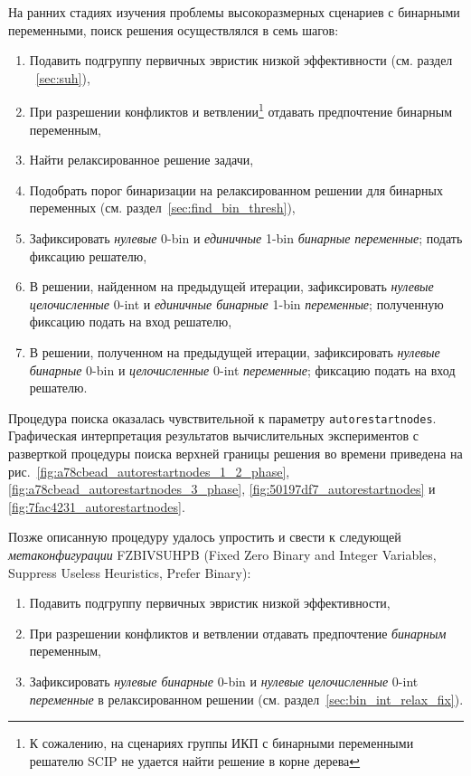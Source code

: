 \documentclass[%
	11pt,
	a4paper,
	utf8,
		]{article}
\begin{document}
На ранних стадиях изучения проблемы высокоразмерных сценариев с бинарными переменными, поиск решения осуществлялся в семь шагов:
\begin{enumerate}
	\item  Подавить подгруппу первичных эвристик низкой эффективности (см. раздел ~\ref{sec:suh}),
	
	\item При разрешении конфликтов и ветвлении\footnote{К сожалению, на сценариях группы ИКП с бинарными переменными решателю SCIP не удается найти решение в корне дерева} отдавать предпочтение бинарным переменным,
	
	\item Найти релаксированное решение задачи,
	
	\item Подобрать порог бинаризации на релаксированном решении для бинарных переменных (см. раздел~\ref{sec:find_bin_thresh}),
	
	\item Зафиксировать \emph{нулевые} 0-bin и \emph{единичные} 1-bin \emph{бинарные переменные}; подать фиксацию решателю,
	
	\item В решении, найденном на предыдущей итерации, зафиксировать \emph{нулевые целочисленные} 0-int и \emph{единичные бинарные} 1-bin \emph{переменные}; полученную фиксацию подать на вход решателю,
	
	\item В решении, полученном на предыдущей итерации, зафиксировать \emph{нулевые бинарные} 0-bin и \emph{целочисленные} 0-int  \emph{переменные}; фиксацию подать на вход решателю.
\end{enumerate}

Процедура поиска оказалась чувствительной к параметру \texttt{autorestartnodes}. Графическая интерпретация результатов вычислительных экспериментов с разверткой процедуры поиска верхней границы решения во времени приведена на рис.~\ref{fig:a78cbead_autorestartnodes_1_2_phase}, \ref{fig:a78cbead_autorestartnodes_3_phase}, \ref{fig:50197df7_autorestartnodes} и \ref{fig:7fac4231_autorestartnodes}.

Позже описанную процедуру удалось упростить и свести к следующей \emph{метаконфигурации} {FZBIVSUHPB} (Fixed Zero Binary and Integer Variables, Suppress Useless Heuristics, Prefer Binary):
\begin{enumerate}
	\item Подавить подгруппу первичных эвристик низкой эффективности,
	
	\item При разрешении конфликтов и ветвлении отдавать предпочтение \emph{бинарным} переменным,
	
	\item Зафиксировать \emph{нулевые бинарные} 0-bin и \emph{нулевые целочисленные} 0-int  \emph{переменные} в релаксированном решении (см. раздел~\ref{sec:bin_int_relax_fix}).
\end{enumerate}
\end{document}
